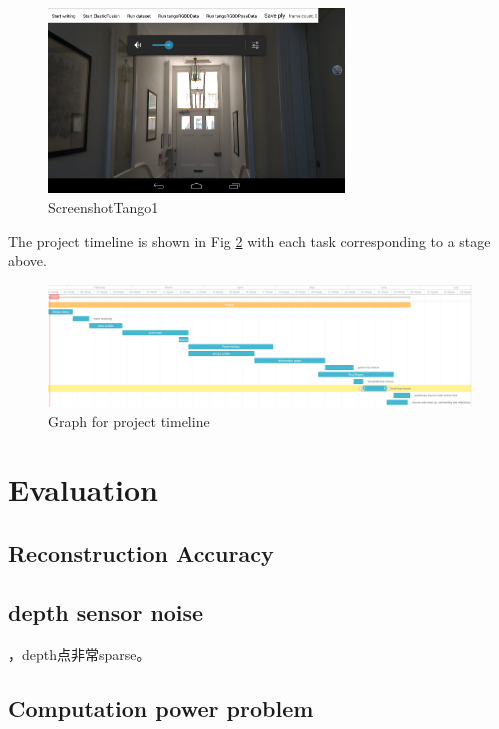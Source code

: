 \documentclass[12pt,twoside]{article}
\begin{document}
\begin{figure}[h]
    \centering
    \includegraphics[width=0.7\textwidth]{figures/ScreenshotTango1}
    \caption{ScreenshotTango1}
    \label{fig:ScreenshotTango1}
\end{figure}




\newpage

The project timeline is shown in Fig \ref{fig:tiemline2} with each task corresponding to a stage above.

\begin{figure}
\centering
    \includegraphics[angle=90,width=\textwidth,height=\textheight,keepaspectratio]{figures/timeline2}
   \caption{Graph for project timeline}
    \label{fig:tiemline2}
\end{figure}

\newpage


\section{Evaluation}

\subsection{Reconstruction Accuracy}

\subsection{depth sensor noise}
，depth点非常sparse。
\subsection{Computation power problem}
\end{document}
